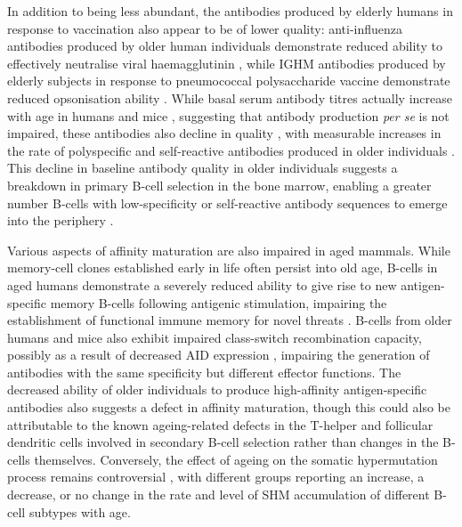 In addition to being less abundant, the antibodies produced by elderly humans in response to vaccination also appear to be of lower quality: anti-influenza antibodies produced by older human individuals demonstrate reduced ability to effectively neutralise viral haemagglutinin \parencite{kogut2012bcells,sasaki2011limited}, while IGHM antibodies produced by elderly subjects in response to pneumococcal polysaccharide vaccine demonstrate reduced opsonisation ability \parencite{kogut2012bcells}. While basal serum antibody titres actually increase with age in humans and mice \parencite{frasca2009ageing}, suggesting that antibody production \textit{per se} is not impaired, these antibodies also decline in quality \parencite{montecino2013immunosenescence}, with measurable increases in the rate of polyspecific and self-reactive antibodies produced in older individuals \parencite{kogut2012bcells}. This decline in baseline antibody quality in older individuals suggests a breakdown in primary B-cell selection in the bone marrow, enabling a greater number B-cells with low-specificity or self-reactive antibody sequences to emerge into the periphery \parencite{ademokun2010ageing}.

Various aspects of affinity maturation are also impaired in aged mammals. While memory-cell clones established early in life often persist into old age, \naive B-cells in aged humans demonstrate a severely reduced ability to give rise to new antigen-specific memory B-cells following antigenic stimulation, impairing the establishment of functional immune memory for novel threats \parencite{aberle2013mechanistic}. B-cells from older humans and mice also exhibit impaired class-switch recombination capacity, possibly as a result of decreased AID expression \parencite{montecino2013immunosenescence,blomberg2013age,frasca2011age}, impairing the generation of antibodies with the same specificity but different effector functions. The decreased ability of older individuals to produce high-affinity antigen-specific antibodies \parencite{frasca2011age} also suggests a defect in affinity maturation, though this could also be attributable to the known ageing-related defects in the T-helper and follicular dendritic cells involved in secondary B-cell selection \parencite{montecino2013immunosenescence,aberle2013mechanistic,ademokun2010ageing} rather than changes in the B-cells themselves. Conversely, the effect of ageing on the somatic hypermutation process remains controversial \parencite{henry2019influenza,howard2006quality,ademokun2010ageing,frasca2009ageing}, with different groups reporting an increase, a decrease, or no change in the rate and level of SHM accumulation of different B-cell subtypes with age. 

